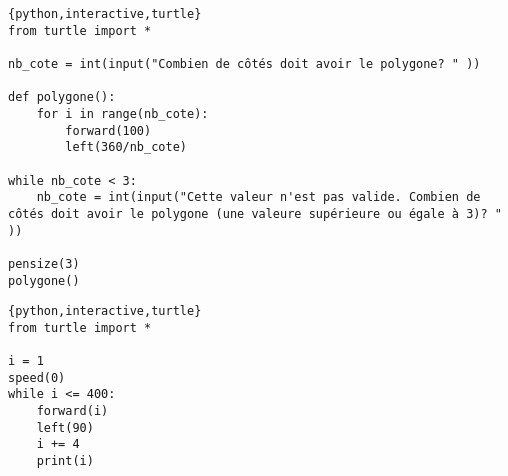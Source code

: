 \documentclass[a4paper,11pt]{article}
\begin{document}
\begin{solution}
\begin{verbatim}{python,interactive,turtle}
from turtle import *

nb_cote = int(input("Combien de côtés doit avoir le polygone? " ))

def polygone():
    for i in range(nb_cote):
        forward(100)
        left(360/nb_cote)

while nb_cote < 3:
    nb_cote = int(input("Cette valeur n'est pas valide. Combien de côtés doit avoir le polygone (une valeure supérieure ou égale à 3)? " ))

pensize(3)
polygone()
\end{verbatim}
\end{solution}

\begin{solution}
\begin{verbatim}{python,interactive,turtle}
from turtle import *

i = 1
speed(0)
while i <= 400:
    forward(i)
    left(90)
    i += 4
    print(i)
\end{verbatim}
\end{solution}
\end{document}
